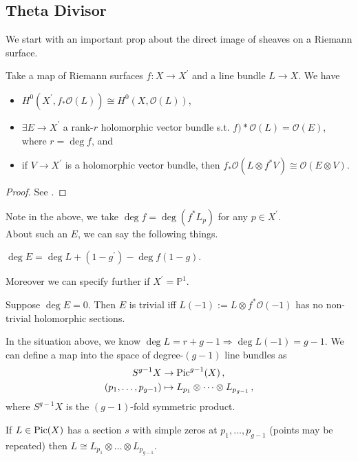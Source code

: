 \documentclass{article}
\begin{document}
\subsection{Theta Divisor}

We start with an important prop about the direct image of sheaves on a Riemann surface.
\begin{prop}
	Take a map of Riemann surfaces $f:X \to X^\prime$ and a line bundle $L \to X$. We have
	\begin{itemize}
		\item $H^0(X^\prime,f_\ast \mathcal{O}(L)) \cong H^0(X,\mathcal{O}(L))$,
		\item $\exists E\to X^\prime$ a rank-$r$ holomorphic vector bundle s.t. $f)\ast \mathcal{O}(L) = \mathcal{O}(E)$, where $r=\deg f$, and 
		\item if $V\to X^\prime$ is a holomorphic vector bundle, then $f_\ast \mathcal{O}(L \otimes f^\ast V) \cong \mathcal{O}(E \otimes V)$.
	\end{itemize}
\end{prop}
\begin{proof}
	See \cite{Hitchin2013,Gunning1967}. 
\end{proof}
Note in the above, we take $\deg f = \deg (f^\ast L_p)$ for any $p \in X^\prime$. \\
About such an $E$, we can say the following things.
\begin{prop}
	$\deg E = \deg L + (1-g^\prime) - \deg f (1-g)$.
\end{prop}
Moreover we can specify further if $X^\prime= \mathbb{P}^1$. 
\begin{prop}
	Suppose $\deg E=0$. Then $E$ is trivial iff $L(-1) := L \otimes f^\ast \mathcal{O}(-1)$ has no non-trivial holomorphic sections. 
\end{prop}
In the situation above, we know $\deg L = r+g-1 \Rightarrow \deg L(-1) = g-1$. We can define a map into the space of degree-$(g-1)$ line bundles as 
\begin{align*}
	S^{g-1}X &\to \operatorname{Pic}^{g-1}(X) \, , \\
	(p_1, \dots, p_{g-1}) &\mapsto L_{p_1} \otimes \dots \otimes L_{p_{g-1}} \, ,
\end{align*}
where $S^{g-1}X$ is the $(g-1)$-fold symmetric product. 
\begin{lemma}
If $L \in \operatorname{Pic}(X)$ has a section $s$ with simple zeros at $p_1, \dots, p_{g-1}$ (points may be repeated) then $L \cong L_{p_1} \otimes \dots \otimes L_{p_{g-1}}$.
\end{lemma}
\end{document}
